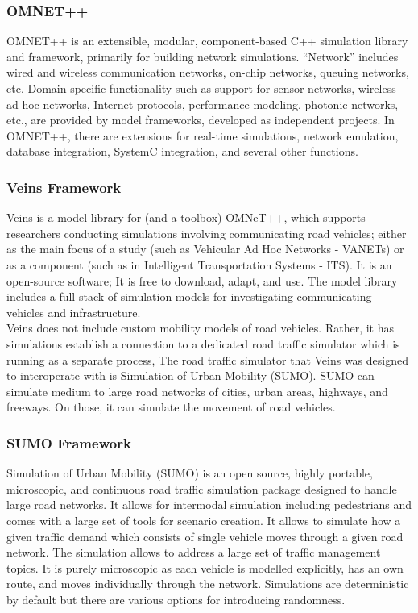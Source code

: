 				\subsubsection{OMNET++}
				OMNET++ \cite{omnet_sim} is an extensible, modular, component-based C++ simulation library and framework, primarily for building network simulations. “Network” includes wired and wireless communication networks, on-chip networks, queuing networks, etc. Domain-specific functionality such as support for sensor networks, wireless ad-hoc networks, Internet protocols, performance modeling, photonic networks, etc., are provided by model frameworks, developed as independent projects. In OMNET++, there are extensions for real-time simulations, network emulation, database integration, SystemC integration, and several other functions. 
				
				\subsubsection{Veins Framework}
				Veins \cite{sommer2019veins} is a model library for (and a toolbox) OMNeT++, which supports researchers conducting simulations involving communicating road vehicles; either as the main focus of a study (such as Vehicular Ad Hoc Networks - VANETs) or as a component (such as in Intelligent Transportation Systems - ITS). It is an open-source software; It is free to download, adapt, and use. The model library includes a full stack of simulation models for investigating communicating vehicles and infrastructure. \\
				Veins does not include custom mobility models of road vehicles. Rather, it has simulations establish a connection to a dedicated road traffic simulator which is running as a separate process, The road traffic simulator that Veins was designed to interoperate with is Simulation of Urban Mobility (SUMO). SUMO can simulate medium to large road networks of cities, urban areas, highways, and freeways. On those, it can simulate the movement of road vehicles. 
				
				\subsubsection{SUMO Framework}
				Simulation of Urban Mobility (SUMO) \cite{sumo} is an open source, highly portable, microscopic, and continuous road traffic simulation package designed to handle large road networks. It allows for intermodal simulation including pedestrians and comes with a large set of tools for scenario creation. It allows to simulate how a given traffic demand which consists of single vehicle moves through a given road network. The simulation allows to address a large set of traffic management topics. It is purely microscopic as each vehicle is modelled explicitly, has an own route, and moves individually through the network. Simulations are deterministic by default but there are various options for introducing randomness. 
	
